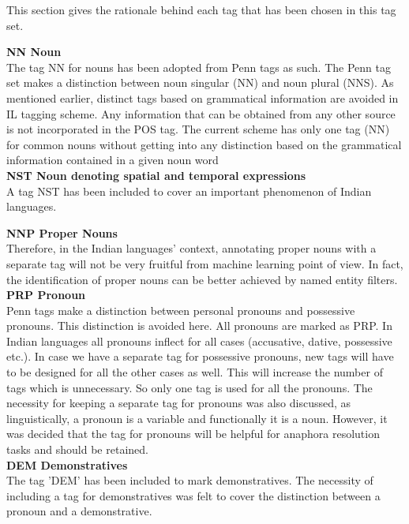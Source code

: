\documentclass[12pt,a4paper,oneside]{memoir}
\begin{document}
This section gives the rationale behind each tag that has been chosen in this tag
set.

\textbf{NN Noun}\\

The tag NN for nouns has been adopted from Penn tags as such. The Penn tag
set makes a distinction between noun singular (NN) and noun plural (NNS).
As mentioned earlier, distinct tags based on grammatical information are 
avoided in IL tagging scheme. Any information that can be obtained from any
other source is not incorporated in the POS tag. The current scheme has only one tag (NN) for common nouns
without getting into any distinction based on the grammatical information
contained in a given noun word\\

\textbf{NST Noun denoting spatial and temporal expressions}\\

A tag NST has been included to cover an important phenomenon of Indian
languages. 

\textbf{NNP Proper Nouns}\\

Therefore, in the Indian languages' context, annotating proper nouns with a
separate tag will not be very fruitful from machine learning point of view. In
fact, the identification of proper nouns can be better achieved by named entity
filters. \\

\textbf{PRP Pronoun}\\

Penn tags make a distinction between personal pronouns and possessive
pronouns. This distinction is avoided here. All pronouns are marked as PRP. In
Indian languages all pronouns inflect for all cases (accusative, dative,
possessive etc.). In case we have a separate tag for possessive pronouns, new
tags will have to be designed for all the other cases as well. This will increase
the number of tags which is unnecessary. So only one tag is used for all the
pronouns. The necessity for keeping a separate tag for pronouns was also
discussed, as linguistically, a pronoun is a variable and functionally it is a
noun. However, it was decided that the tag for pronouns will be helpful for
anaphora resolution tasks and should be retained. \\

\textbf{ DEM Demonstratives }\\

The tag 'DEM' has been included to mark demonstratives. The necessity of
including a tag for demonstratives was felt to cover the distinction between a
pronoun and a demonstrative.\\
\end{document}
